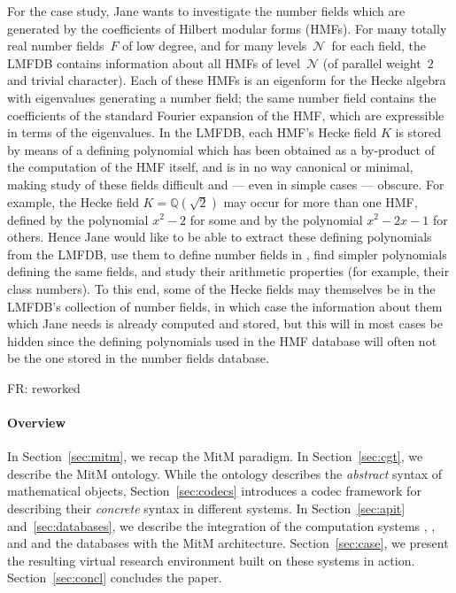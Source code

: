 \def\Q{{\mathbb Q}}
\def\N{{\mathcal{N}}}
For the \LMFDB case study, Jane wants to investigate the number fields which are generated by the coefficients of Hilbert modular forms (HMFs).
For many totally real number fields~$F$ of low degree, and for many levels~$\N$\ for each field, the LMFDB contains information about all HMFs of level~$\N$ (of parallel weight~$2$ and trivial character).
Each of these HMFs is an eigenform for the Hecke algebra with eigenvalues generating a number field; the same number field contains the coefficients of the standard Fourier expansion of the HMF, which are expressible in terms of the eigenvalues.
In the LMFDB, each HMF's Hecke field $K$ is stored by means of a defining polynomial which has been obtained as a by-product of the computation of the HMF itself, and is in no way canonical or minimal, making study of these fields difficult and --- even in simple cases --- obscure.
For example, the Hecke field $K=\Q(\sqrt{2})$ may occur for more than one HMF, defined by the polynomial $x^2-2$ for some and by the polynomial $x^2-2x-1$ for others.
Hence Jane would like to be able to extract these defining polynomials from the LMFDB, use them to define number fields in \Sage, find simpler polynomials defining the same fields, and study their arithmetic properties (for example, their class numbers).
To this end, some of the Hecke fields may themselves be in the LMFDB's collection of number fields, in which case the information about them which Jane needs is already computed and stored, but this will in most cases be hidden since the defining polynomials used in the HMF database will often not be the one stored in the number fields database.

\begin{newpart}{FR: reworked}
\paragraph{Overview}
In Section~\ref{sec:mitm}, we recap the MitM paradigm.
In Section~\ref{sec:cgt}, we describe the MitM ontology.
While the ontology describes the \emph{abstract} syntax of mathematical objects, Section~\ref{sec:codecs} introduces a codec framework for describing their \emph{concrete} syntax in different systems.
In Section~\ref{sec:apit} and~\ref{sec:databases}, we describe the integration of the computation systems \GAP, \Sage, and \Singular and the databases with the MitM architecture.
Section~\ref{sec:case}, we present the resulting virtual research environment built on
these systems in action.
Section~\ref{sec:concl} concludes the paper.
\end{newpart}

